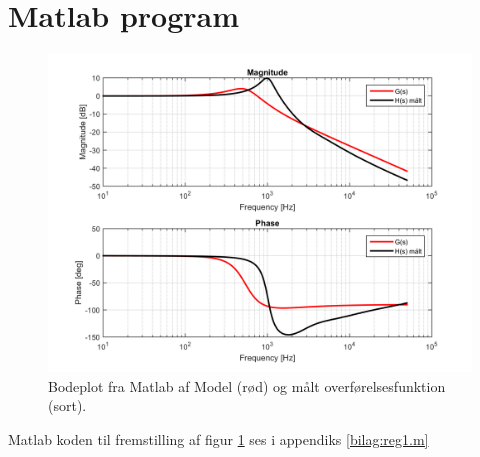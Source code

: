 \section{Matlab program}\label{sec:spm3}

\begin{figure}[h!]
	\centering
	\includegraphics[width=.8\textwidth]{reg1/bodeplot.png}
	\caption{Bodeplot fra Matlab af Model (rød) og målt overførelsesfunktion (sort).}
	\label{fig:bodeplot}
\end{figure}
\FloatBlock

Matlab koden til fremstilling af figur \ref{fig:bodeplot} ses i appendiks \ref{bilag:reg1.m}